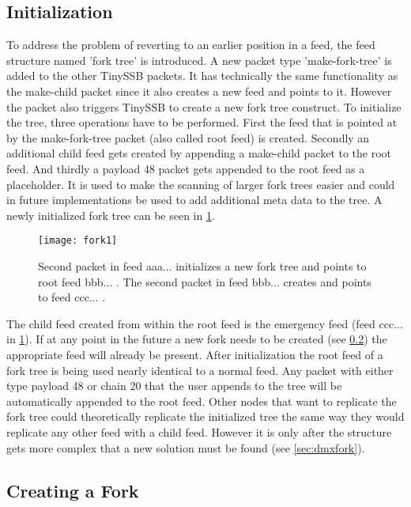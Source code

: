 \subsection{Initialization}
To address the problem of reverting to an earlier position in a feed, the feed structure named 'fork tree' is introduced. A new packet type 'make-fork-tree' is added to the other TinySSB packets. It has technically the same functionality as the make-child packet since it also creates a new feed and points to it. However the packet also triggers TinySSB to create a new fork tree construct. To initialize the tree, three operations have to be performed. First the feed that is pointed at by the make-fork-tree packet (also called root feed) is created. Secondly an additional child feed gets created by appending a make-child packet to the root feed. And thirdly a payload 48 packet gets appended to the root feed as a placeholder. It is used to make the scanning of larger fork trees easier and could in future implementations be used to add additional meta data to the tree. A newly initialized fork tree can be seen in \cref{fig:fork1}.

\begin{figure}
\centering
\texttt{[image: fork1]}
\caption{Second packet in feed aaa... initializes a new fork tree and points to root feed bbb... . The second packet in feed bbb... creates and points to feed ccc... .}
\label{fig:fork1}
\end{figure}
 
The child feed created from within the root feed is the emergency feed (feed ccc... in \cref{fig:fork1}). If at any point in the future a new fork needs to be created (see \cref{sec:forking}) the appropriate feed will already be present. After initialization the root feed of a fork tree is being used nearly identical to a normal feed. Any packet with either type payload 48 or chain 20 that the user appends to the tree will be automatically appended to the root feed. Other nodes that want to replicate the fork tree could theoretically replicate the initialized tree the same way they would replicate any other feed with a child feed. However it is only after the structure gets more complex that a new solution must be found (see \cref{sec:dmxfork}).

\subsection{Creating a Fork}
\label{sec:forking}

